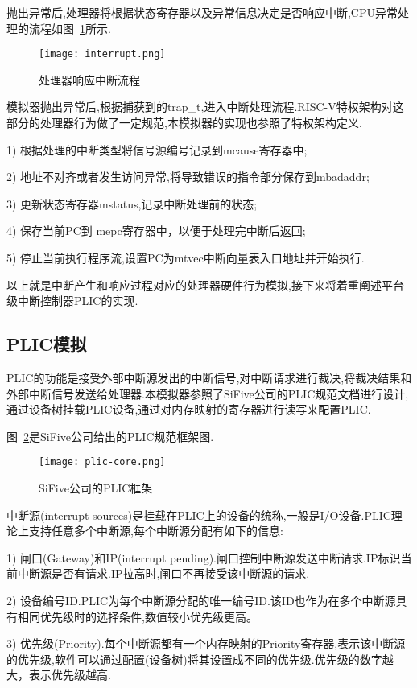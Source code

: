抛出异常后,处理器将根据状态寄存器以及异常信息决定是否响应中断,CPU异常处理的流程如图~\ref{fig:interrupt}所示.
\begin{figure}[H]
    \centering
    \texttt{[image: interrupt.png]}
    \caption{处理器响应中断流程}
    \label{fig:interrupt}
\end{figure}

模拟器抛出异常后,根据捕获到的trap\_t,进入中断处理流程.RISC-V特权架构对这部分的处理器行为做了一定规范,本模拟器的实现也参照了特权架构定义.


1) 根据处理的中断类型将信号源编号记录到mcause寄存器中;


2) 地址不对齐或者发生访问异常,将导致错误的指令部分保存到mbadaddr;


3) 更新状态寄存器mstatus,记录中断处理前的状态;


4) 保存当前PC到 mepc寄存器中，以便于处理完中断后返回;


5) 停止当前执行程序流,设置PC为mtvec中断向量表入口地址并开始执行.


以上就是中断产生和响应过程对应的处理器硬件行为模拟,接下来将着重阐述平台级中断控制器PLIC的实现.


\subsection{PLIC模拟}

PLIC的功能是接受外部中断源发出的中断信号,对中断请求进行裁决,将裁决结果和外部中断信号发送给处理器.本模拟器参照了SiFive公司的PLIC规范文档进行设计,通过设备树挂载PLIC设备,通过对内存映射的寄存器进行读写来配置PLIC.


图~\ref{fig:plic-core}是SiFive公司给出的PLIC规范框架图.
\begin{figure}[H]
    \centering
    \texttt{[image: plic-core.png]}
    \caption{SiFive公司的PLIC框架}
    \label{fig:plic-core}
\end{figure}


中断源(interrupt sources)是挂载在PLIC上的设备的统称,一般是I/O设备.PLIC理论上支持任意多个中断源,每个中断源分配有如下的信息:


1) 闸口(Gateway)和IP(interrupt pending).闸口控制中断源发送中断请求.IP标识当前中断源是否有请求.IP拉高时,闸口不再接受该中断源的请求.


2) 设备编号ID.PLIC为每个中断源分配的唯一编号ID.该ID也作为在多个中断源具有相同优先级时的选择条件,数值较小优先级更高。


3) 优先级(Priority).每个中断源都有一个内存映射的Priority寄存器,表示该中断源的优先级,软件可以通过配置(设备树)将其设置成不同的优先级.优先级的数字越大，表示优先级越高.



